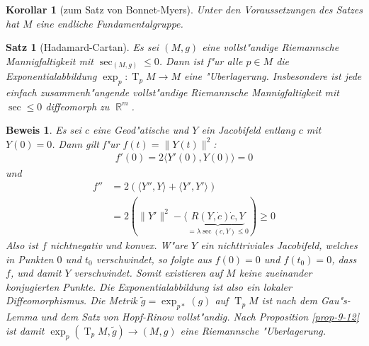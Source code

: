 \documentclass[paper=A4, twoside, chapterprefix=true, bibliography=totoc, headsepline]{scrbook}
\DeclareMathOperator{\R}{\mathbb{R}}
\DeclareMathOperator{\T}{T} %
\theoremstyle{plain}
\newtheorem{Satz}[Dfn]{Satz}
\theoremstyle{nonumberplain}
\newtheorem{kor}{Korollar}
\newtheorem{bew}{Beweis}
\theoremstyle{empty}
\theoremstyle{break}
\begin{document}
\begin{kor}[zum Satz von Bonnet-Myers]
  Unter den Voraussetzungen des Satzes hat $M$ eine endliche Fundamentalgruppe.
\end{kor}

\begin{Satz}[Hadamard-Cartan]
  Es sei $(M,g)$ eine vollst"andige Riemannsche Mannigfaltigkeit mit $\sec_{(M,g)} \le 0$. Dann ist f"ur alle $p \in M$ die Exponentialabbildung $\exp_p: \T_pM \to M$ eine "Uberlagerung.
  Insbesondere ist jede einfach zusammenh"angende vollst"andige Riemannsche Mannigfaltigkeit mit $\sec \le 0$ diffeomorph zu $\R^m$.
\end{Satz}

\begin{bew}
  Es sei $c$ eine Geod"atische und $Y$ ein Jacobifeld entlang $c$ mit $Y(0) = 0$. Dann gilt f"ur $f(t) = \|Y(t)\|^2$:
  \begin{align*}
    f'(0) = 2 \langle Y'(0), Y(0) \rangle = 0
  \end{align*}
  und
  \begin{align*}
    f'' &= 2 (\langle Y'', Y \rangle + \langle Y', Y' \rangle)\\
    &= 2 (\|Y'\|^2 - \langle \underbrace{R(Y, \dot c) \dot c, Y}_{=\lambda\sec(\dot c, Y) \le 0}) \ge 0
  \end{align*}
  Also ist $f$ nichtnegativ und konvex. W"are $Y$ ein nichttriviales Jacobifeld, welches in Punkten $0$ und $t_0$ verschwindet, so folgte aus $f(0) = 0$ und $f(t_0) = 0$, dass $f$, und damit $Y$ verschwindet.
  Somit existieren auf $M$ keine zueinander konjugierten Punkte.
  Die Exponentialabbildung ist also ein lokaler Diffeomorphismus.
  Die Metrik $\tilde g = \exp_{p*}(g)$ auf $\T_pM$ ist nach dem Gau"s-Lemma und dem Satz von Hopf-Rinow vollst"andig.
  Nach Proposition \ref{prop-9-12} ist damit $\exp_p(\T_pM, \tilde g) \to (M,g)$ eine Riemannsche "Uberlagerung.
\end{bew}
\end{document}
